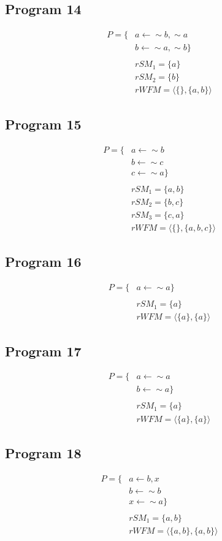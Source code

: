 \subsection{Program 14}
\begin{align*}
P=\{
& a\leftarrow \sim b,\sim a\\
& b\leftarrow \sim a, \sim b
\}\\
\\
& rSM_{1}=\{a\}\\
& rSM_{2}=\{b\}\\
& rWFM=\langle\{\},\{a,b\}\rangle\end{align*}

\subsection{Program 15}
\begin{align*}
P=\{
& a\leftarrow \sim b\\
& b\leftarrow \sim c\\
& c\leftarrow \sim a
\}\\
\\
& rSM_{1}=\{a,b\}\\
& rSM_{2}=\{b,c\}\\
& rSM_{3}=\{c,a\}\\
& rWFM=\langle\{\},\{a,b,c\}\rangle\end{align*}

\subsection{Program 16}
\begin{align*}
P=\{
& a\leftarrow \sim a
\}\\
\\
& rSM_{1}=\{a\}\\
& rWFM=\langle\{a\},\{a\}\rangle\end{align*}

\subsection{Program 17}
\begin{align*}
P=\{
& a\leftarrow \sim a\\
& b\leftarrow \sim a
\}\\
\\
& rSM_{1}=\{a\}\\
& rWFM=\langle\{a\},\{a\}\rangle\end{align*}

\subsection{Program 18}
\begin{align*}
P=\{
& a\leftarrow b,x\\
& b\leftarrow \sim b\\
& x\leftarrow \sim a
\}\\
\\
& rSM_{1}=\{a,b\}\\
& rWFM=\langle\{a,b\},\{a,b\}\rangle\end{align*}

